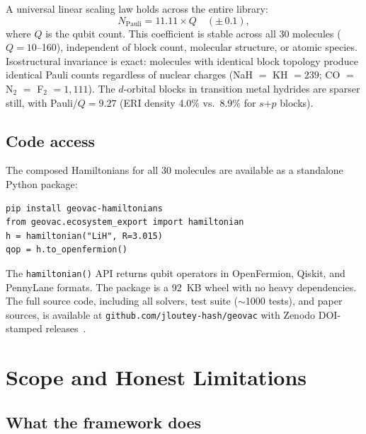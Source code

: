 \documentclass[aps,pra,twocolumn,superscriptaddress,longbibliography]{revtex4-2}
\begin{document}
A universal linear scaling law holds across the entire library:
\begin{equation}
N_{\text{Pauli}} = 11.11 \times Q \quad (\pm\, 0.1),
\label{eq:linear_scaling}
\end{equation}
where $Q$ is the qubit count.  This coefficient is stable across all
30 molecules ($Q = 10$--160), independent of block count, molecular
structure, or atomic species.  Isostructural invariance is exact:
molecules with identical block topology produce identical Pauli counts
regardless of nuclear charges (NaH $=$ KH $= 239$;
CO $=$ N$_2$ $=$ F$_2$ $= 1{,}111$).  The $d$-orbital blocks in
transition metal hydrides are sparser still, with Pauli/$Q = 9.27$
(ERI density 4.0\% vs.\ 8.9\% for $s$+$p$ blocks).

\subsection{Code access}

The composed Hamiltonians for all 30 molecules are available as a
standalone Python package:
\begin{verbatim}
pip install geovac-hamiltonians
from geovac.ecosystem_export import hamiltonian
h = hamiltonian("LiH", R=3.015)
qop = h.to_openfermion()
\end{verbatim}
The \texttt{hamiltonian()} API returns qubit operators in OpenFermion,
Qiskit, and PennyLane formats.  The package is a 92~KB wheel with no
heavy dependencies.  The full source code, including all solvers,
test suite ($\sim$1000 tests), and paper sources, is available at
\texttt{github.com/jloutey-hash/geovac} with Zenodo DOI-stamped
releases~\cite{Paper20}.


\section{Scope and Honest Limitations}
\label{sec:limitations}

\subsection{What the framework does}
\end{document}

